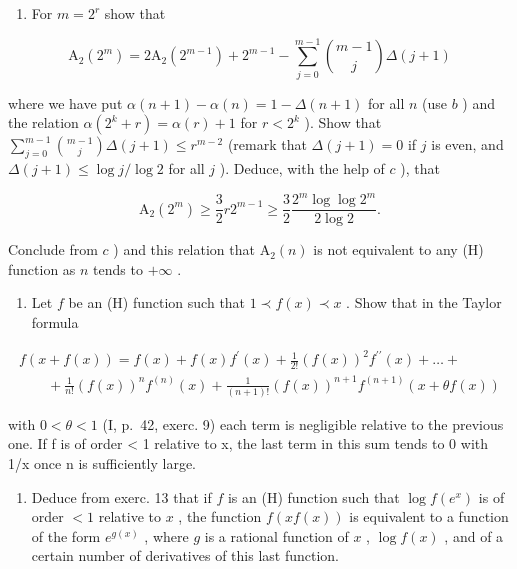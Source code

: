 \begin{enumerate}
\def\labelenumi{\alph{enumi})}
\setcounter{enumi}{3}
\tightlist
\item
  For \(m = 2^{r}\) show that
\end{enumerate}

\[
\mathrm{A} _ {2} (2 ^ {m}) = 2 \mathrm{A} _ {2} (2 ^ {m - 1}) + 2 ^ {m - 1} - \sum_ {j = 0} ^ {m - 1} \binom {m - 1} {j} \Delta (j + 1)
\]

where we have put \(\alpha(n+1)-\alpha(n)=1-\Delta(n+1)\) for all \(n\) (use \(b\) ) and the relation \(\alpha(2^{k}+r)=\alpha(r)+1\) for \(r<2^{k}\) ). Show that \(\sum_{j=0}^{m-1}\binom{m-1}{j}\Delta(j+1)\leqslant r^{m-2}\) (remark that \(\Delta(j+1)=0\) if \(j\) is even, and \(\Delta(j+1)\leqslant\log j/\log 2\) for all \(j\) ). Deduce, with the help of \(c\) ), that

\[
\mathrm{A} _ {2} (2 ^ {m}) \geqslant \frac {3}{2} r 2 ^ {m - 1} \geqslant \frac {3}{2} \frac {2 ^ {m} \log \log 2 ^ {m}}{2 \log 2}.
\]

Conclude from \(c\) ) and this relation that \(\mathrm{A}_2(n)\) is not equivalent to any (H) function as \(n\) tends to \(+\infty\) .

\begin{enumerate}
\def\labelenumi{\arabic{enumi})}
\setcounter{enumi}{12}
\tightlist
\item
  Let \(f\) be an (H) function such that \(1 \prec f(x) \prec x\) . Show that in the Taylor formula
\end{enumerate}

\[
\begin{array}{l} f (x + f (x)) = f (x) + f (x) f ^ {\prime} (x) + \frac {1}{2 !} (f (x)) ^ {2} f ^ {\prime \prime} (x) + \dots + \\ \qquad + \frac {1}{n !} (f (x)) ^ {n} f ^ {(n)} (x) + \frac {1}{(n + 1) !} (f (x)) ^ {n + 1} f ^ {(n + 1)} (x + \theta f (x)) \end{array}
\]

with \(0 < \theta < 1\) (I, p.~42, exerc. 9) each term is negligible relative to the previous one. If f is of order \textless{} 1 relative to x, the last term in this sum tends to 0 with 1/x once n is sufficiently large.

\begin{enumerate}
\def\labelenumi{\arabic{enumi})}
\setcounter{enumi}{13}
\tightlist
\item
  Deduce from exerc. 13 that if \(f\) is an (H) function such that \(\log f(e^x)\) is of order \(< 1\) relative to \(x\) , the function \(f(xf(x))\) is equivalent to a function of the form \(e^{g(x)}\) , where \(g\) is a rational function of \(x\) , \(\log f(x)\) , and of a certain number of derivatives of this last function.
\end{enumerate}

